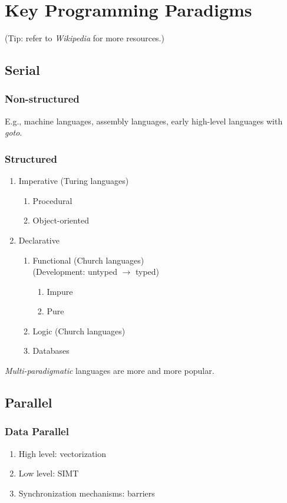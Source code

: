 \documentclass{article}
\begin{document}
\appendix
\section{Key Programming Paradigms}
(Tip: refer to \emph{Wikipedia} for more resources.)
\subsection{Serial}
\subsubsection{Non-structured}
E.g., machine languages, assembly languages, early high-level languages with \emph{goto}.
\subsubsection{Structured}
\begin{enumerate}
    \item Imperative
    (Turing languages)
    \begin{enumerate}
        \item Procedural
        \item Object-oriented
    \end{enumerate}
    \item Declarative
    \begin{enumerate}
        \item Functional
        (Church languages)\\
        (Development: untyped $\rightarrow$ typed)
        \begin{enumerate}
            \item Impure
            \item Pure
        \end{enumerate}
        \item Logic
        (Church languages)
        \item Databases
    \end{enumerate}
\end{enumerate}
\emph{Multi-paradigmatic} languages are more and more popular.
\subsection{Parallel}
\subsubsection{Data Parallel}
\begin{enumerate}
    \item High level: vectorization
    \item Low level: SIMT
    \item Synchronization mechanisms: barriers
\end{enumerate}
\end{document}
